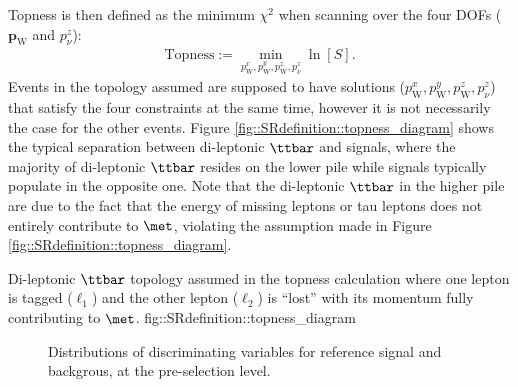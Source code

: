 Topness is then defined as the minimum $\chi^2$ when scanning over the four DOFs ($\bm{p}_{\mathrm{W}}$ and $p_{\nu}^z$):
\begin{align}
\mathrm{Topness} := \min_{p_{\mathrm{W}}^x, p_{\mathrm{W}}^y, p_{\mathrm{W}}^z, p_{\nu}^z} \ln[S].
\end{align}
Events in the topology assumed are supposed to have solutions ($p_{\mathrm{W}}^x, p_{\mathrm{W}}^y, p_{\mathrm{W}}^z, p_{\nu}^z$) that satisfy the four constraints at the same time, however it is not necessarily the case for the other events. Figure \ref{fig::SRdefinition::topness_diagram} shows the typical separation between di-leptonic $\ttbar$ and signals, where the majority of di-leptonic $\ttbar$ resides on the lower pile while signals typically populate in the opposite one. 
Note that the di-leptonic $\ttbar$ in the higher pile are due to the fact that the energy of missing leptons or tau leptons does not entirely contribute to $\met$, violating the assumption made in Figure \ref{fig::SRdefinition::topness_diagram}. 

{}
{Di-leptonic $\ttbar$ topology assumed in the topness calculation where one lepton is tagged ($\ell_1$) and the other lepton ($\ell_2$) is ``lost'' with its momentum fully contributing to $\met$. 
}
{fig::SRdefinition::topness_diagram}


\begin{figure}[h]
  \centering
    \caption{ 
    Distributions of discriminating variables for reference signal and backgrous, at the pre-selection level.
    \label{fig::SRdefinition::distVar1}       
    }
\end{figure}


